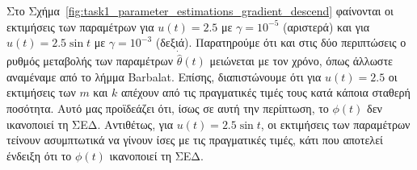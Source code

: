 \documentclass[a4paper,12pt]{article}
\begin{document}
Στο Σχήμα~\ref{fig:task1_parameter_estimations_gradient_descend} φαίνονται οι εκτιμήσεις των παραμέτρων για
$u(t) = 2.5$ με $\gamma = 10^{-5}$ (αριστερά) και για $u(t) = 2.5 \sin t$ με $\gamma = 10^{-3}$ (δεξιά). 
Παρατηρούμε ότι και στις δύο περιπτώσεις ο ρυθμός μεταβολής των παραμέτρων $\dot{\hat{\theta}}(t)$ μειώνεται με
τον χρόνο, όπως άλλωστε αναμέναμε από το λήμμα Barbalat. Επίσης,
διαπιστώνουμε ότι για $u(t) = 2.5$ οι εκτιμήσεις των $m$ και $k$ απέχουν από τις πραγματικές τιμές τους κατά 
κάποια σταθερή ποσότητα. Αυτό μας προϊδεάζει ότι, ίσως σε αυτή την περίπτωση, το $\phi(t)$ δεν ικανοποιεί τη
ΣΕΔ. Αντιθέτως, για $u(t) = 2.5 \sin t$, οι εκτιμήσεις των παραμέτρων τείνουν ασυμπτωτικά να γίνουν ίσες με τις
πραγματικές τιμές, κάτι που αποτελεί ένδειξη ότι το $\phi(t)$ ικανοποιεί τη ΣΕΔ.
\end{document}
